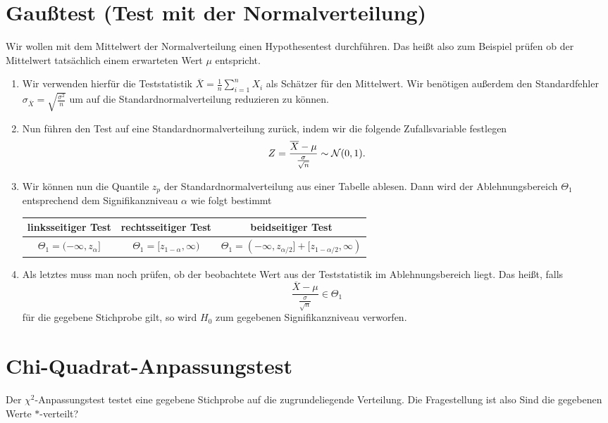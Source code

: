 \section{Gaußtest (Test mit der Normalverteilung)}
Wir wollen mit dem Mittelwert der Normalverteilung einen Hypothesentest durchführen. Das heißt also zum Beispiel prüfen ob der Mittelwert tatsächlich einem erwarteten Wert $\mu$ entspricht.
\begin{enumerate}
	\item Wir verwenden hierfür die Teststatistik $\overline X=\frac1n\sum_{i=1}^n X_i$ als Schätzer für den Mittelwert. Wir benötigen außerdem den Standardfehler $\sigma_{\overline X}=\sqrt{\frac{\sigma^2}{n}}$ um auf die Standardnormalverteilung reduzieren zu können.
	\item Nun führen den Test auf eine Standardnormalverteilung zurück, indem wir die folgende Zufallsvariable festlegen
	\begin{equation*}
		Z=\frac{\overline X-\mu}{\frac{\sigma}{\sqrt n}}\sim\mathcal{N}(0,1).
	\end{equation*}
	\item Wir können nun die Quantile $z_p$ der Standardnormalverteilung aus einer Tabelle ablesen.
	Dann wird der Ablehnungsbereich $\Theta_1$ entsprechend dem Signifikanzniveau $\alpha$ wie folgt bestimmt
	\begin{center}
		\begin{tabular}{c|c|c}
			linksseitiger Test&rechtsseitiger Test&beidseitiger Test\\\hline
			$\Theta_1=(-\infty, z_{\alpha}]$&$\Theta_1=[z_{1-\alpha},\infty)$&$\Theta_1=(-\infty, z_{\alpha/2}]+[z_{1-\alpha/2},\infty)$
		\end{tabular}
	\end{center}
	\item Als letztes muss man noch prüfen, ob der beobachtete Wert aus der Teststatistik im Ablehnungsbereich liegt. Das heißt, falls
	\begin{equation*}
	 	\frac{\overline X-\mu}{\frac{\sigma}{\sqrt n}}\in \Theta_1
	\end{equation*}
	für die gegebene Stichprobe gilt, so wird $H_0$ zum gegebenen Signifikanzniveau verworfen.
\end{enumerate}

\section{Chi-Quadrat-Anpassungstest}
Der $\chi^2$-Anpassungstest testet eine gegebene Stichprobe auf die zugrundeliegende Verteilung. Die Fragestellung ist also \glqq Sind die gegebenen Werte $\ast$-verteilt?\grqq

